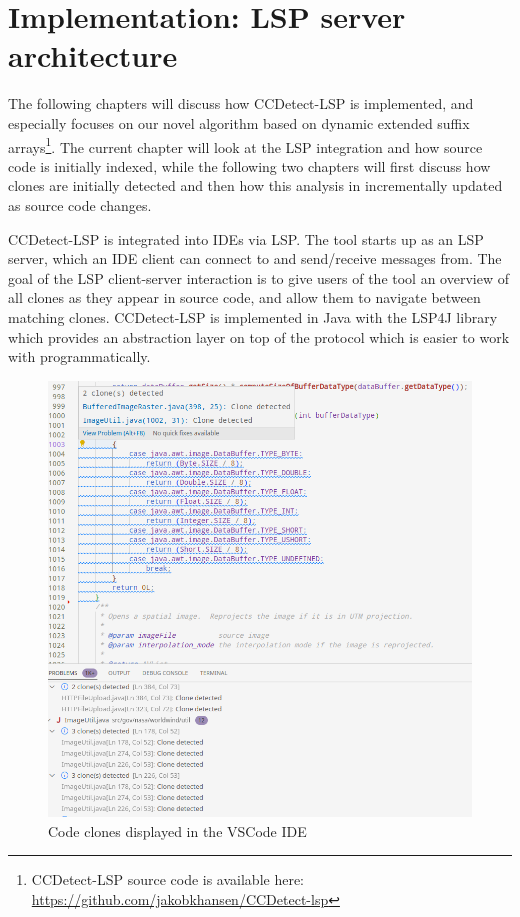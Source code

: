 \chapter{Implementation: LSP server architecture}
\label{lspimplementation}

The following chapters will discuss how CCDetect-LSP is implemented, and especially
focuses on our novel algorithm based on dynamic extended suffix
arrays\footnote{CCDetect-LSP source code is available here:
\url{https://github.com/jakobkhansen/CCDetect-lsp}}. The current chapter will look at the
LSP integration and how source code is initially indexed, while the following two chapters
will first discuss how clones are initially detected and then how this analysis in
incrementally updated as source code changes.

CCDetect-LSP is integrated into IDEs via LSP. The tool starts up as an LSP server, which
an IDE client can connect to and send/receive messages from. The goal of the LSP
client-server interaction is to give users of the tool an overview of all clones as they
appear in source code, and allow them to navigate between matching clones. CCDetect-LSP is
implemented in Java with the LSP4J library which provides an abstraction layer on top of
the protocol which is easier to work with programmatically.

\begin{figure}[ht!]
	\includegraphics[width=\textwidth]{figures/vscodecodeclone.png}
	\caption{Code clones displayed in the VSCode IDE}
	\label{fig:vscodeclones}
\end{figure}

